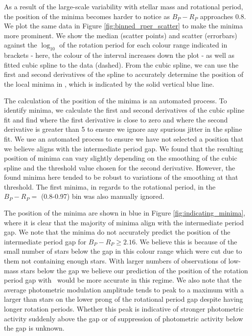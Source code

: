 As a result of the large-scale variability with stellar mass and rotational period, the position of the minima becomes harder to notice as $B_P - R_P$ approaches 0.8.
We plot the same data in Figure \ref{fig:binned_rper_scatter} to make the minima more prominent.
We show the median \rper{} (scatter points) and scatter (errorbars) against the $\log_{10}$ of the rotation period for each colour range indicated in brackets - here, the colour of the interval increases down the plot - as well as fitted cubic spline to the data (dashed).
From the cubic spline, we can use the first and second derivatives of the spline to accurately determine the position of the local minima in \rper{}, which is indicated by the solid vertical blue line.

The calculation of the position of the minima is an automated process.
To identify minima, we calculate the first and second derivatives of the cubic spline fit and find where the first derivative is close to zero and where the second derivative is greater than 5 to ensure we ignore any spurious jitter in the spline fit.
We use an automated process to ensure we have not selected a position that we believe aligns with the intermediate period gap.
We found that the resulting position of minima can vary slightly depending on the smoothing of the cubic spline and the threshold value chosen for the second derivative.
However, the found minima here tended to be robust to variations of the smoothing at that threshold.
The first minima, in regards to the rotational period, in the $B_P-R_P =$ (0.8-0.97) bin was also manually ignored.

The position of the minima are shown in blue in Figure \ref{fig:indicating_minima}, where it is clear that the majority of minima align with the intermediate period gap.
We note that the minima do not accurately predict the position of the intermediate period gap for $B_P-R_P \geq 2.16$.
We believe this is because of the small number of stars below the gap in this colour range which were cut due to them not containing enough stars.
 With larger numbers of observations of low-mass stars below the gap we believe our prediction of the position of the rotation period gap with \rper{} \ would be more accurate in this regime. 
We also note that the average photometric modulation amplitude tends to peak to a maximum with a larger \rper{} than stars on the lower prong of the rotational period gap despite having longer rotation periods.
Whether this peak is indicative of stronger photometric activity suddenly above the gap or of suppression of photometric activity below the gap is unknown.

